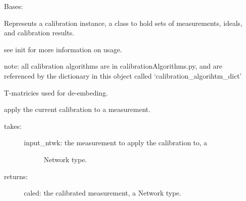 \documentclass[letterpaper,10pt,english]{sphinxmanual}
\begin{document}
\begin{fulllineitems}
\label{api/mwavepy.calibration:mwavepy.calibration.calibration.Calibration}
Bases: 

Represents a calibration instance, a class to hold sets
of measurements, ideals, and calibration results.

see init for more information on usage.

note:
all calibration algorithms are in calibrationAlgorithms.py, and are
referenced by the dictionary in this object called
`calibration\_algorihtm\_dict'

\begin{fulllineitems}
\label{api/mwavepy.calibration:mwavepy.calibration.calibration.Calibration.Ts}
T-matricies used for de-embeding.

\end{fulllineitems}


\begin{fulllineitems}
\label{api/mwavepy.calibration:mwavepy.calibration.calibration.Calibration.apply_cal}
apply the current calibration to a measurement.
\begin{description}
\item[{takes:}] \leavevmode\begin{description}
\item[{input\_ntwk: the measurement to apply the calibration to, a}] \leavevmode
Network type.

\end{description}

\item[{returns:}] \leavevmode
caled: the calibrated measurement, a Network type.

\end{description}

\end{fulllineitems}



\end{fulllineitems}
\end{document}
